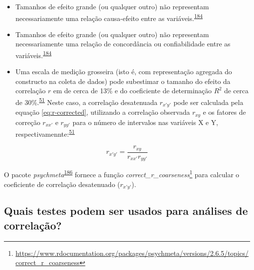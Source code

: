 \documentclass[
  a4paper,
]{book}
\renewcommand{\href}[2]{#2\footnote{\url{#1}}}
\newenvironment{infobox}[1]
  {
  \begin{itemize}
  \renewcommand{\labelitemi}{
    \raisebox{-.7\height}[0pt][0pt]{
      {\setkeys{Gin}{width=3em,keepaspectratio}
        \texttt{[image: \#1]}}
    }
  }
  \setlength{\fboxsep}{1em}
  \begin{blackbox}
  \item
  }
  {
  \end{blackbox}
  \end{itemize}
  }
\begin{document}
\begin{itemize}
\item
  Tamanhos de efeito grande (ou qualquer outro) não representam necessariamente uma relação causa-efeito entre as variáveis.\textsuperscript{\protect\hyperlink{ref-khamis2008}{184}}
\item
  Tamanhos de efeito grande (ou qualquer outro) não representam necessariamente uma relação de concordância ou confiabilidade entre as variáveis.\textsuperscript{\protect\hyperlink{ref-khamis2008}{184}}
\item
  Uma escala de medição grosseira (isto é, com representação agregada do constructo na coleta de dados) pode subestimar o tamanho do efeito da correlação \(r\) em de cerca de 13\% e do coeficiente de determinação \(R^2\) de cerca de 30\%.\textsuperscript{\protect\hyperlink{ref-aguinis2008}{51}} Neste caso, a correlação desatenuada \(r_{x'y'}\) pode ser calculada pela equação \eqref{eq:r-corrected}, utilizando a correlação observada \(r_{xy}\) e os fatores de correção \(r_{xx'}\) e \(r_{yy'}\) para o número de intervalos nas variáveis X e Y, respectivamennte:\textsuperscript{\protect\hyperlink{ref-aguinis2008}{51}}
\end{itemize}

\begin{equation}
\label{eq:r-corrected}
r_{x'y'} = \dfrac{r_{xy}}{r_{xx'}r_{yy'}}
\end{equation}

\begin{infobox}{images/Rlogo}
O pacote \emph{psychmeta}\textsuperscript{\protect\hyperlink{ref-psychmeta}{186}} fornece a função \href{https://www.rdocumentation.org/packages/psychmeta/versions/2.6.5/topics/correct_r_coarseness}{\emph{correct\_r\_coarseness}} para calcular o coeficiente de correlação desatenuado (\(r_{x'y'}\)).

\end{infobox}

\hypertarget{quais-testes-podem-ser-usados-para-anuxe1lises-de-correlauxe7uxe3o}{%
\subsection{Quais testes podem ser usados para análises de correlação?}\label{quais-testes-podem-ser-usados-para-anuxe1lises-de-correlauxe7uxe3o}}
\end{document}
